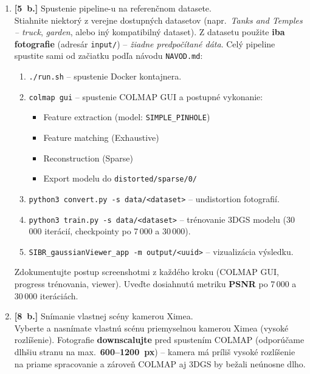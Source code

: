 \documentclass{article}
\begin{document}
\begin{enumerate}

\item \textbf{[5~b.]} Spustenie pipeline-u na referenčnom datasete.\\
Stiahnite niektorý z verejne dostupných datasetov (napr.\ \textit{Tanks and
Temples – truck}, \textit{garden}, alebo iný kompatibilný dataset).
Z datasetu použite \textbf{iba fotografie} (adresár \texttt{input/}) –
\emph{žiadne predpočítané dáta}.
Celý pipeline spustite sami od začiatku podľa návodu \texttt{NAVOD.md}:       

\begin{enumerate}
    \item \texttt{./run.sh} – spustenie Docker kontajnera.
    \item \texttt{colmap gui} – spustenie COLMAP GUI a postupné vykonanie:
        \begin{itemize}
            \item Feature extraction (model: \texttt{SIMPLE\_PINHOLE})
            \item Feature matching (Exhaustive)
            \item Reconstruction (Sparse)
            \item Export modelu do \texttt{distorted/sparse/0/}
        \end{itemize}
    \item \texttt{python3 convert.py -s data/<dataset>} – undistortion fotografií.
    \item \texttt{python3 train.py -s data/<dataset>} – trénovanie 3DGS modelu
          (30\,000 iterácií, checkpointy po 7\,000 a 30\,000).
    \item \texttt{SIBR\_gaussianViewer\_app -m output/<uuid>} – vizualizácia výsledku.
\end{enumerate}

Zdokumentujte postup screenshotmi z každého kroku (COLMAP GUI, progress trénovania,
viewer). Uveďte dosiahnutú metriku \textbf{PSNR} po 7\,000 a 30\,000 iteráciách.

\item \textbf{[8~b.]} Snímanie vlastnej scény kamerou Ximea.\\
Vyberte a nasnímate vlastnú scénu priemyselnou kamerou Ximea (vysoké rozlíšenie).
Fotografie \textbf{downscalujte} pred spustením COLMAP
(odporúčame dlhšiu stranu na max.\ \textbf{600–1200~px}) – kamera má príliš
vysoké rozlíšenie na priame spracovanie a zároveň COLMAP aj 3DGS by bežali
neúnosne dlho.


\end{enumerate}
\end{document}
